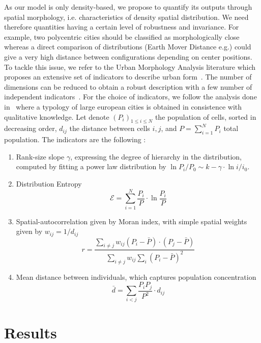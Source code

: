 \documentclass[10pt,letterpaper]{article}
\begin{document}


As our model is only density-based, we propose to quantify its outputs through spatial morphology, i.e. characteristics of density spatial distribution. We need therefore quantities having a certain level of robustness and invariance. For example, two polycentric cities should be classified as morphologically close whereas a direct comparison of distributions (Earth Mover Distance e.g.) could give a very high distance between configurations depending on center positions. To tackle this issue, we refer to the Urban Morphology Analysis literature which proposes an extensive set of indicators to describe urban form~\cite{tsai2005quantifying}. The number of dimensions can be reduced to obtain a robust description with a few number of independent indicators~\cite{Schwarz201029}. For the choice of indicators, we follow the analysis done in~\cite{le2015forme} where a typology of large european cities is obtained in consistence with qualitative knowledge. Let denote $(P_i)_{1\leq i \leq N}$ the population of cells, sorted in decreasing order, $d_{ij}$ the distance between cells $i,j$, and $P=\sum_{i=1}^{N} P_i$ total population. The indicators are the following :

\begin{enumerate}
\item Rank-size slope $\gamma$, expressing the degree of hierarchy in the distribution, computed by fitting a power law distribution by $\ln{P_i/P_0} \sim k - \gamma\cdot \ln{i/i_0}$.
\item Distribution Entropy
\[
\mathcal{E} = \sum_{i=1}^{N}\frac{P_i}{P}\cdot \ln{\frac{P_i}{P}}
\]
\item Spatial-autocorrelation given by Moran index, with simple spatial weights given by $w_{ij} = 1/d_{ij}$
\[
r = \frac{\sum_{i\neq j} w_{ij} \left(P_i - \bar{P}\right)\cdot\left(P_j - \bar{P}\right)}{\sum_{i\neq j} w_{ij} \sum_{i}{\left( P_i - \bar{P}\right)}^2}
\]
\item Mean distance between individuals, which captures population concentration
\[
\bar{d} = \sum_{i<j} \frac{P_i P_j}{P^2} \cdot d_{ij}
\]
\end{enumerate}



\section{Results}
\end{document}
